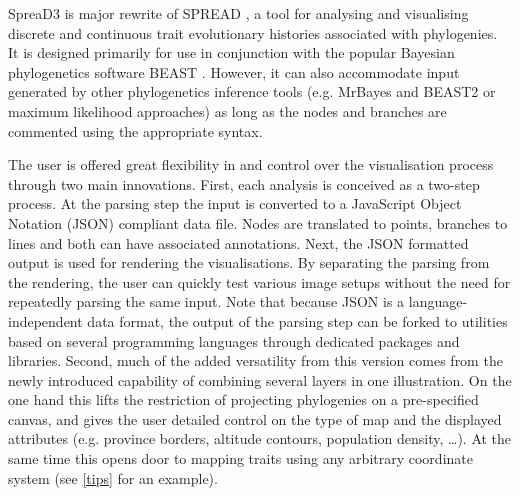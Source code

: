\documentclass[english]{paper}
\begin{document}

SpreaD3 is major rewrite of SPREAD \citep{bielejec11}, a tool for analysing and visualising discrete and continuous trait evolutionary histories associated with phylogenies.
It is designed primarily for use in conjunction with the popular Bayesian phylogenetics software BEAST \citep{drummond:2012zr}.
However, it can also accommodate input generated by other phylogenetics inference tools (e.g. MrBayes and BEAST2 or maximum likelihood approaches) as long as the nodes and branches are commented using the appropriate syntax.
\par
The user is offered great flexibility in and control over the visualisation process through two main innovations.
First, each analysis is conceived as a two-step process. 
At the parsing step the input is converted to a JavaScript Object Notation (JSON) compliant data file.
Nodes are translated to points, branches to lines and both can have associated annotations. 
Next, the JSON formatted output is used for rendering the visualisations.
By separating the parsing from the rendering, the user can quickly test various image setups without the need for repeatedly parsing the same input.
Note that because JSON is a language-independent data format, the output of the parsing step can be forked to utilities based on several programming languages through dedicated packages and libraries. %
Second, much of the added versatility from this version comes from the newly introduced capability of combining several layers in one illustration. %
On the one hand this lifts the restriction of projecting phylogenies on a pre-specified canvas, and gives the user detailed control on the type of map and the displayed %
attributes (e.g. province borders, altitude contours, population density, \dots). %
At the same time this opens door to mapping traits using any arbitrary coordinate system (see \ref{tips} for an example). 
\end{document}
